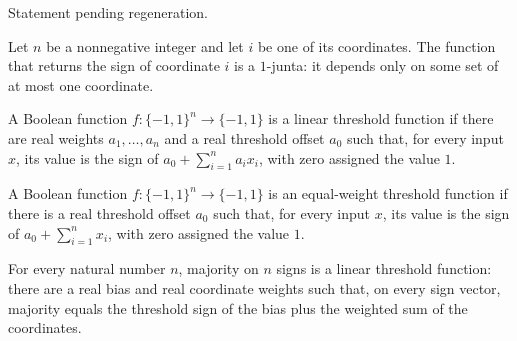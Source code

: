 \begin{theorem}
\label{FABL.isKJunta_iff_exists_factorization}
\leanok
{}
Statement pending regeneration.
\end{theorem}

\begin{theorem}
\label{FABL.dictator_isKJunta}
\leanok
{}
Let $n$ be a nonnegative integer and let $i$ be one of its coordinates. The function
that returns the sign of coordinate $i$ is a $1$-junta: it depends only on some set of
at most one coordinate.
\end{theorem}

\begin{definition}
\label{FABL.IsLinearThreshold}
\leanok
{}
A Boolean function $f\colon\{-1,1\}^n\to\{-1,1\}$ is a linear threshold function if
there are real weights $a_1,\ldots,a_n$ and a real threshold offset $a_0$ such that, for
every input $x$, its value is the sign of $a_0+\sum_{i=1}^n a_i x_i$, with zero assigned
the value $1$.
\end{definition}

\begin{definition}
\label{FABL.IsEqualWeightThreshold}
\leanok
{}
A Boolean function $f\colon\{-1,1\}^n\to\{-1,1\}$ is an equal-weight threshold function
if there is a real threshold offset $a_0$ such that, for every input $x$, its value is
the sign of $a_0+\sum_{i=1}^n x_i$, with zero assigned the value $1$.
\end{definition}

\begin{theorem}
\label{FABL.majority_isLinearThreshold}
\leanok
{}
For every natural number $n$, majority on $n$ signs is a linear threshold function:
there are a real bias and real coordinate weights such that, on every sign vector,
majority equals the threshold sign of the bias plus the weighted sum of the coordinates.
\end{theorem}

